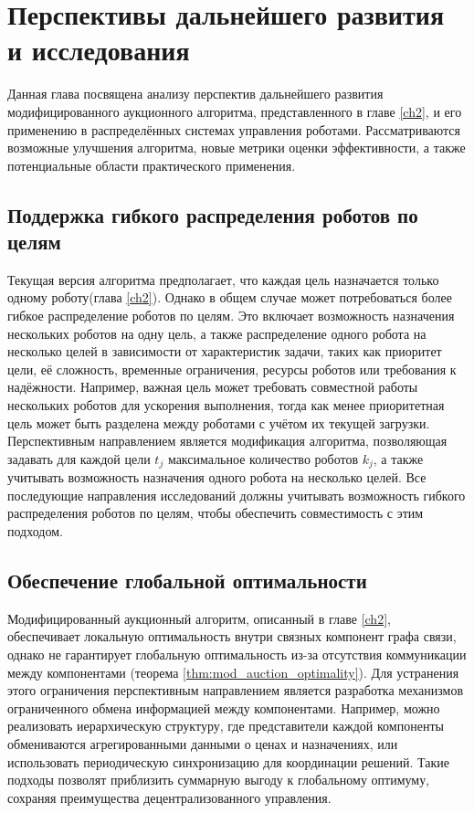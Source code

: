 \chapter{Перспективы дальнейшего развития и исследования}
\label{ch5}

Данная глава посвящена анализу перспектив дальнейшего развития модифицированного аукционного алгоритма, представленного в главе \ref{ch2}, и его применению в распределённых системах управления роботами. Рассматриваются возможные улучшения алгоритма, новые метрики оценки эффективности, а также потенциальные области практического применения.

\section{Поддержка гибкого распределения роботов по целям}
Текущая версия алгоритма предполагает, что каждая цель назначается только одному роботу(глава \ref{ch2}). Однако в общем случае может потребоваться более гибкое распределение роботов по целям. Это включает возможность назначения нескольких роботов на одну цель, а также распределение одного робота на несколько целей в зависимости от характеристик задачи, таких как приоритет цели, её сложность, временные ограничения, ресурсы роботов или требования к надёжности. Например, важная цель может требовать совместной работы нескольких роботов для ускорения выполнения, тогда как менее приоритетная цель может быть разделена между роботами с учётом их текущей загрузки. Перспективным направлением является модификация алгоритма, позволяющая задавать для каждой цели $t_j$ максимальное количество роботов $k_j$, а также учитывать возможность назначения одного робота на несколько целей. Все последующие направления исследований должны учитывать возможность гибкого распределения роботов по целям, чтобы обеспечить совместимость с этим подходом.

\section{Обеспечение глобальной оптимальности}
Модифицированный аукционный алгоритм, описанный в главе \ref{ch2}, обеспечивает локальную оптимальность внутри связных компонент графа связи, однако не гарантирует глобальную оптимальность из-за отсутствия коммуникации между компонентами (теорема \ref{thm:mod_auction_optimality}). Для устранения этого ограничения перспективным направлением является разработка механизмов ограниченного обмена информацией между компонентами. Например, можно реализовать иерархическую структуру, где представители каждой компоненты обмениваются агрегированными данными о ценах и назначениях, или использовать периодическую синхронизацию для координации решений. Такие подходы позволят приблизить суммарную выгоду к глобальному оптимуму, сохраняя преимущества децентрализованного управления.

